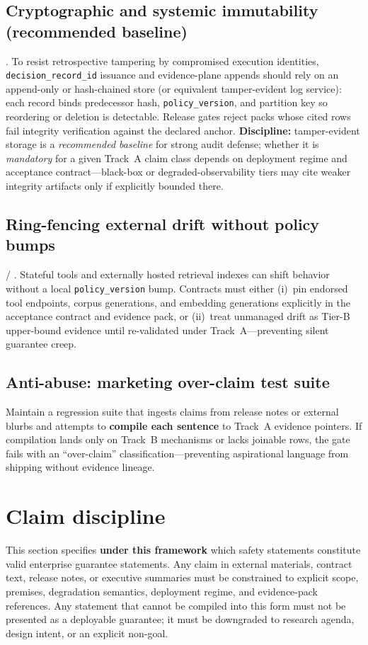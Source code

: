 \documentclass[11pt,a4paper]{report}
\begin{document}
\subsection{Cryptographic and systemic immutability (recommended baseline)}
\EvalFramework{}. To resist retrospective tampering by compromised execution identities, \texttt{decision\_record\_id} issuance and evidence-plane appends should rely on an append-only or hash-chained store (or equivalent tamper-evident log service): each record binds predecessor hash, \texttt{policy\_version}, and partition key so reordering or deletion is detectable. Release gates reject packs whose cited rows fail integrity verification against the declared anchor. \textbf{Discipline:} tamper-evident storage is a \emph{recommended baseline} for strong audit defense; whether it is \emph{mandatory} for a given Track~A claim class depends on deployment regime and acceptance contract---black-box or degraded-observability tiers may cite weaker integrity artifacts only if explicitly bounded there.

\subsection{Ring-fencing external drift without policy bumps}
\EvalFramework{} / \ControlPlane{}. Stateful tools and externally hosted retrieval indexes can shift behavior without a local \texttt{policy\_version} bump. Contracts must either (i)~pin endorsed tool endpoints, corpus generations, and embedding generations explicitly in the acceptance contract and evidence pack, or (ii)~treat unmanaged drift as Tier-B upper-bound evidence until re-validated under Track~A---preventing silent guarantee creep.

\subsection{Anti-abuse: marketing over-claim test suite}
Maintain a regression suite that ingests claims from release notes or external blurbs and attempts to \textbf{compile each sentence} to Track~A evidence pointers. If compilation lands only on Track~B mechanisms or lacks joinable rows, the gate fails with an ``over-claim'' classification---preventing aspirational language from shipping without evidence lineage.

\section{Claim discipline}
\noindent This section specifies \textbf{under this framework} which safety statements constitute valid enterprise guarantee statements. Any claim in external materials, contract text, release notes, or executive summaries must be constrained to explicit scope, premises, degradation semantics, deployment regime, and evidence-pack references. Any statement that cannot be compiled into this form must not be presented as a deployable guarantee; it must be downgraded to research agenda, design intent, or an explicit non-goal.
\end{document}
